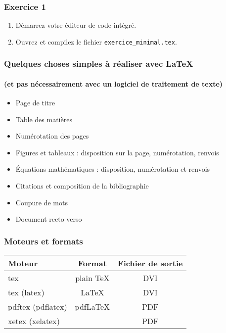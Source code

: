
\begin{frame}[c]
	
	\frametitle{Exercice 1}
	
	\begin{enumerate}
		\item Démarrez votre éditeur de code intégré.
		\item Ouvrez et compilez le fichier \texttt{exercice\_minimal.tex}.
	\end{enumerate}

\end{frame}


\begin{frame}

	\frametitle{Quelques choses simples à réaliser avec {\LaTeX}}
	\framesubtitle{(et pas nécessairement avec un logiciel de traitement de texte)}
	
	\begin{itemize}
		\item Page de titre
		\item Table des matières
		\item Numérotation des pages
		\item Figures et tableaux : disposition sur la page, numérotation, renvois
		\item Équations mathématiques : disposition, numérotation et renvois
		\item Citations et composition de la bibliographie
		\item Coupure de mots
		\item Document recto verso
	\end{itemize}

\end{frame}

\begin{frame}[c]
	
	\frametitle{Moteurs et formats}
	
	\begin{table}
		\begin{tabular}{lcc}
			\hline\hline
			Moteur				&	Format			&	Fichier de sortie \\
			\hline
			tex					&	plain \TeX		&	DVI	\\
			tex (latex)			&	\LaTeX			&	DVI \\
			pdftex (pdflatex)	&	pdf\LaTeX		&	PDF \\
			xetex (xelatex)		&	\XeLaTeX		&	PDF \\
			\hline\hline
		\end{tabular}
	\end{table}

\end{frame}

